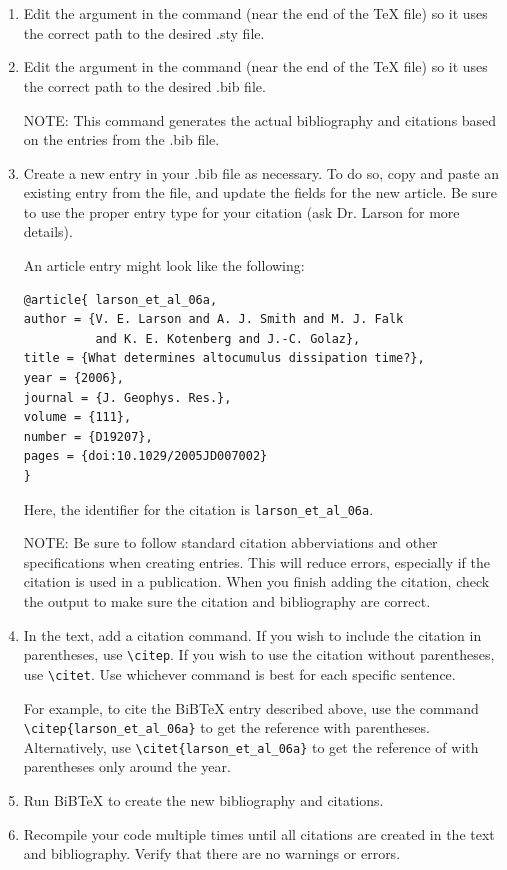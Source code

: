 \documentclass[master]{UWMThesis}
\begin{document}
\begin{enumerate}

\item  Edit the argument in the \verb== command (near the end of the TeX file) so it uses the correct path to the desired .sty file.  

\item Edit the argument in the \verb== command (near the end of the TeX file) so it uses the correct path to the desired .bib file.

NOTE: This command generates the actual bibliography and citations based on the entries from the .bib file.

\item Create a new entry in your .bib file as necessary.  To do so, copy and paste an existing entry from the file, and update the fields for the new article.  Be sure to use the proper entry type for your citation (ask Dr. Larson for more details).

An article entry might look like the following:
\begin{verbatim}
@article{ larson_et_al_06a,
author = {V. E. Larson and A. J. Smith and M. J. Falk
          and K. E. Kotenberg and J.-C. Golaz},
title = {What determines altocumulus dissipation time?},
year = {2006},
journal = {J. Geophys. Res.},
volume = {111},
number = {D19207},
pages = {doi:10.1029/2005JD007002}
}
\end{verbatim}

Here, the identifier for the citation is \verb=larson_et_al_06a=.

NOTE: Be sure to follow standard citation abberviations and other specifications when creating entries.  This will reduce errors, especially if the citation is used in a publication.  When you finish adding the citation, check the output to make sure the citation and bibliography are correct.

\item In the text, add a citation command.  If you wish to include the citation in parentheses, use \verb=\citep=.  If you wish to use the citation without parentheses, use \verb=\citet=.  Use whichever command is best for each specific sentence.

For example, to cite the BiBTeX entry described above, use the command
\verb=\citep{larson_et_al_06a}= to get the reference \citep{larson_et_al_06a} with parentheses.  Alternatively, use \verb=\citet{larson_et_al_06a}= to get the reference of \citet{larson_et_al_06a} with parentheses only around the year.

\item Run BiBTeX to create the new bibliography and citations.

\item Recompile your code multiple times until all citations are created in the text and bibliography.  Verify that there are no warnings or errors.

\end{enumerate}
\end{document}

